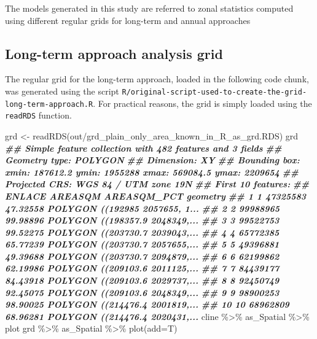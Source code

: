 \documentclass[10pt,landscape,a3paper]{article}
\newenvironment{Shaded}{\begin{snugshade}}{\end{snugshade}}
\newcommand{\AttributeTok}[1]{\textcolor[rgb]{0.77,0.63,0.00}{#1}}
\newcommand{\DocumentationTok}[1]{\textcolor[rgb]{0.56,0.35,0.01}{\textbf{\textit{#1}}}}
\newcommand{\FunctionTok}[1]{\textcolor[rgb]{0.00,0.00,0.00}{#1}}
\newcommand{\NormalTok}[1]{#1}
\newcommand{\OtherTok}[1]{\textcolor[rgb]{0.56,0.35,0.01}{#1}}
\newcommand{\SpecialCharTok}[1]{\textcolor[rgb]{0.00,0.00,0.00}{#1}}
\newcommand{\StringTok}[1]{\textcolor[rgb]{0.31,0.60,0.02}{#1}}
\begin{document}
The models generated in this study are referred to zonal statistics
computed using different regular grids for long-term and annual
approaches

\hypertarget{long-term-approach-analysis-grid}{%
\subsection{Long-term approach analysis
grid}\label{long-term-approach-analysis-grid}}

The regular grid for the long-term approach, loaded in the following
code chunk, was generated using the script
\texttt{R/original-script-used-to-create-the-grid-long-term-approach.R}.
For practical reasons, the grid is simply loaded using the
\texttt{readRDS} function.

\begin{Shaded}
\begin{Highlighting}[]
\NormalTok{grd }\OtherTok{\textless{}{-}} \FunctionTok{readRDS}\NormalTok{(}\StringTok{\textquotesingle{}out/grd\_plain\_only\_area\_known\_in\_R\_as\_grd.RDS\textquotesingle{}}\NormalTok{)}
\NormalTok{grd}
\DocumentationTok{\#\# Simple feature collection with 482 features and 3 fields}
\DocumentationTok{\#\# Geometry type: POLYGON}
\DocumentationTok{\#\# Dimension:     XY}
\DocumentationTok{\#\# Bounding box:  xmin: 187612.2 ymin: 1955288 xmax: 569084.5 ymax: 2209654}
\DocumentationTok{\#\# Projected CRS: WGS 84 / UTM zone 19N}
\DocumentationTok{\#\# First 10 features:}
\DocumentationTok{\#\#    ENLACE  AREASQM AREASQM\_PCT                       geometry}
\DocumentationTok{\#\# 1       1 47325583    47.32558 POLYGON ((192985 2057655, 1...}
\DocumentationTok{\#\# 2       2 99988965    99.98896 POLYGON ((198357.9 2048349,...}
\DocumentationTok{\#\# 3       3 99522753    99.52275 POLYGON ((203730.7 2039043,...}
\DocumentationTok{\#\# 4       4 65772385    65.77239 POLYGON ((203730.7 2057655,...}
\DocumentationTok{\#\# 5       5 49396881    49.39688 POLYGON ((203730.7 2094879,...}
\DocumentationTok{\#\# 6       6 62199862    62.19986 POLYGON ((209103.6 2011125,...}
\DocumentationTok{\#\# 7       7 84439177    84.43918 POLYGON ((209103.6 2029737,...}
\DocumentationTok{\#\# 8       8 92450749    92.45075 POLYGON ((209103.6 2048349,...}
\DocumentationTok{\#\# 9       9 98900253    98.90025 POLYGON ((214476.4 2001819,...}
\DocumentationTok{\#\# 10     10 68962809    68.96281 POLYGON ((214476.4 2020431,...}
\NormalTok{cline }\SpecialCharTok{\%\textgreater{}\%}\NormalTok{ as\_Spatial }\SpecialCharTok{\%\textgreater{}\%}\NormalTok{ plot}
\NormalTok{grd }\SpecialCharTok{\%\textgreater{}\%}\NormalTok{ as\_Spatial }\SpecialCharTok{\%\textgreater{}\%} \FunctionTok{plot}\NormalTok{(}\AttributeTok{add=}\NormalTok{T)}
\end{Highlighting}
\end{Shaded}
\end{document}
